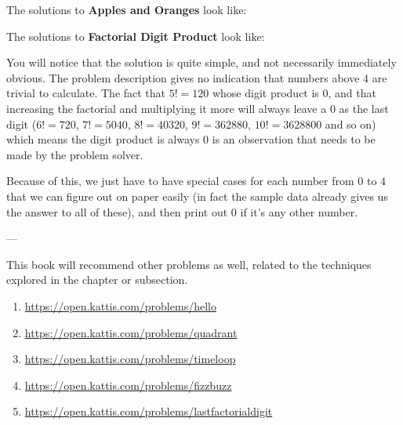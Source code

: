 The solutions to \textbf{Apples and Oranges} look like:


The solutions to \textbf{Factorial Digit Product} look like:


You will notice that the solution is quite simple, and not necessarily immediately obvious. The problem description gives no indication that numbers above 4 are trivial to calculate. The fact that $5! = 120$ whose digit product is $0$, and that increasing the factorial and multiplying it more will always leave a $0$ as the last digit ($6! = 720$, $7! = 5040$, $8! = 40320$, $9! = 362880$, $10! = 3628800$ and so on) which means the digit product is always $0$ is an observation that needs to be made by the problem solver.

Because of this, we just have to have special cases for each number from $0$ to $4$ that we can figure out on paper easily (in fact the sample data already gives us the answer to all of these), and then print out $0$ if it's any other number.

---

This book will recommend other problems as well, related to the techniques explored in the chapter or subsection.

\begin{enumerate}
\item \url{https://open.kattis.com/problems/hello}
\item \url{https://open.kattis.com/problems/quadrant}
\item \url{https://open.kattis.com/problems/timeloop}
\item \url{https://open.kattis.com/problems/fizzbuzz}
\item \url{https://open.kattis.com/problems/lastfactorialdigit}
\end{enumerate}
